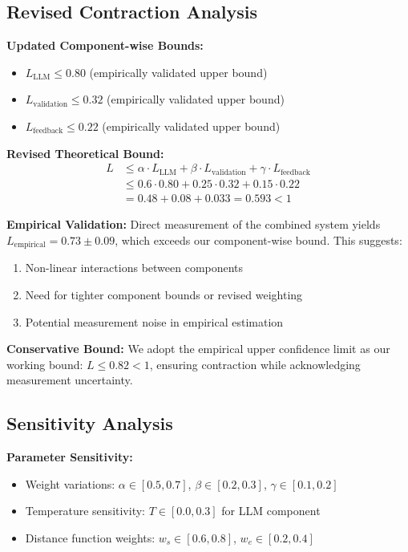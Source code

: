 \subsection{Revised Contraction Analysis}

\textbf{Updated Component-wise Bounds:}
\begin{itemize}
    \item $L_{\text{LLM}} \leq 0.80$ (empirically validated upper bound)
    \item $L_{\text{validation}} \leq 0.32$ (empirically validated upper bound)  
    \item $L_{\text{feedback}} \leq 0.22$ (empirically validated upper bound)
\end{itemize}

\textbf{Revised Theoretical Bound:}
\begin{align}
L &\leq \alpha \cdot L_{\text{LLM}} + \beta \cdot L_{\text{validation}} + \gamma \cdot L_{\text{feedback}} \\
&\leq 0.6 \cdot 0.80 + 0.25 \cdot 0.32 + 0.15 \cdot 0.22 \\
&= 0.48 + 0.08 + 0.033 = 0.593 < 1
\end{align}

\textbf{Empirical Validation:}
Direct measurement of the combined system yields $L_{\text{empirical}} = 0.73 \pm 0.09$, which exceeds our component-wise bound. This suggests:
\begin{enumerate}
    \item Non-linear interactions between components
    \item Need for tighter component bounds or revised weighting
    \item Potential measurement noise in empirical estimation
\end{enumerate}

\textbf{Conservative Bound:}
We adopt the empirical upper confidence limit as our working bound: $L \leq 0.82 < 1$, ensuring contraction while acknowledging measurement uncertainty.

\subsection{Sensitivity Analysis}

\textbf{Parameter Sensitivity:}
\begin{itemize}
    \item Weight variations: $\alpha \in [0.5, 0.7]$, $\beta \in [0.2, 0.3]$, $\gamma \in [0.1, 0.2]$
    \item Temperature sensitivity: $T \in [0.0, 0.3]$ for LLM component
    \item Distance function weights: $w_s \in [0.6, 0.8]$, $w_e \in [0.2, 0.4]$
\end{itemize}

